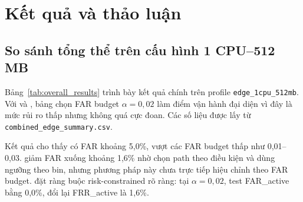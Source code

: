 \section{Kết quả và thảo luận}
\label{sec:results}

\subsection{So sánh tổng thể trên cấu hình 1 CPU--512 MB}

Bảng~\ref{tab:overall_results} trình bày kết quả chính trên profile \texttt{edge\_1cpu\_512mb}. Với  và , bảng chọn FAR budget $\alpha=0{,}02$ làm điểm vận hành đại diện vì đây là mức rủi ro thấp nhưng không quá cực đoan. Các số liệu được lấy từ \texttt{combined\_edge\_summary.csv}.

\begin{table}[!htbp]
\centering
\caption{So sánh tổng thể trên profile \texttt{edge\_1cpu\_512mb}. Với /, $\alpha=0{,}02$.}
\label{tab:overall_results}
\end{table}

Kết quả cho thấy  có FAR khoảng 5,0\%, vượt các FAR budget thấp như 0,01--0,03.  giảm FAR xuống khoảng 1,6\% nhờ chọn path theo điều kiện và dùng ngưỡng theo bin, nhưng phương pháp này chưa trực tiếp hiệu chỉnh theo FAR budget.  đặt ràng buộc risk-constrained rõ ràng: tại $\alpha=0{,}02$, test FAR\_active bằng 0,0\%, đổi lại FRR\_active là 1,6\%.

